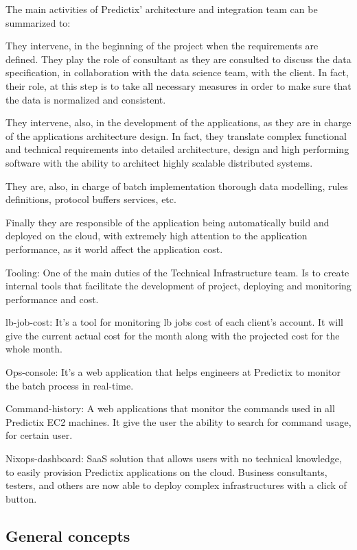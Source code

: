 The main activities of Predictix' architecture and integration team can be
summarized to:

They intervene, in the beginning of the project when the requirements are
defined. They play the role of consultant as they are consulted to discuss the
data specification, in collaboration with the data science team, with the
client. In fact, their role, at this step is to take all necessary measures in
order to make sure that the data is normalized and consistent.

They intervene, also, in the development of the applications, as they are in
charge of the applications architecture design. In fact, they translate complex
functional and technical requirements into detailed architecture, design and
high performing software with the ability to architect highly scalable
distributed systems.

They are, also, in charge of batch implementation thorough data modelling, rules
definitions, protocol buffers services, etc.

Finally they are responsible of the application being automatically build and
deployed on the cloud, with extremely high attention to the application
performance, as it world affect the application cost.

Tooling:
One of the main duties of the Technical Infrastructure team. Is to create
internal tools that facilitate the development of project, deploying and
monitoring performance and cost.

lb-job-cost: It's a tool for monitoring lb jobs cost of each client's account.
It will give the current actual cost for the month along with the projected cost
for the whole month.

Ops-console: It's a web application that helps engineers at Predictix to monitor
the batch process in real-time.

Command-history: A web applications that monitor the commands used in all
Predictix EC2 machines. It give the user the ability to search for command
usage, for certain user.

Nixops-dashboard:
SaaS solution that allows users with no technical knowledge, to easily provision
Predictix applications on the cloud.  Business consultants, testers, and others are
now able to deploy complex infrastructures with a click of button.


\subsection{General concepts}

